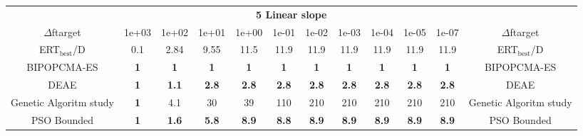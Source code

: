 \begin{tabular}{cccccccccccc}
 & \multicolumn{10}{c}{{\normalsize \textbf{5 Linear slope}}}\\
$\Delta$ftarget& 1e+03& 1e+02& 1e+01& 1e+00& 1e-01& 1e-02& 1e-03& 1e-04& 1e-05& 1e-07 & $\Delta$ftarget \\
ERT$_{\textrm{best}}$/D& 0.1& 2.84& 9.55& 11.5& 11.9& 11.9& 11.9& 11.9& 11.9& 11.9 & ERT$_{\textrm{best}}$/D \\
\hline
BIPOPCMA-ES & \textbf{1} & \textbf{1} & \textbf{1} & \textbf{1} & \textbf{1} & \textbf{1} & \textbf{1} & \textbf{1} & \textbf{1} & \textbf{1} & BIPOPCMA-ES \cite{add_an_entry_for_BIPOPCMA-ES_in_bbob.bib}\\
DEAE & \textbf{1} & \textbf{1.1} & \textbf{2.8} & \textbf{2.8} & \textbf{2.8} & \textbf{2.8} & \textbf{2.8} & \textbf{2.8} & \textbf{2.8} & \textbf{2.8} & DEAE \cite{add_an_entry_for_DEAE_in_bbob.bib}\\
Genetic Algoritm study & \textbf{1} & 4.1 & 30 & 39 & 110 & 210 & 210 & 210 & 210 & 210 & Genetic Algoritm study \cite{add_an_entry_for_Genetic Algoritm study_in_bbob.bib}\\
PSO Bounded & \textbf{1} & \textbf{1.6} & \textbf{5.8} & \textbf{8.9} & \textbf{8.8} & \textbf{8.9} & \textbf{8.9} & \textbf{8.9} & \textbf{8.9} & \textbf{8.9} & PSO Bounded \cite{add_an_entry_for_PSO Bounded_in_bbob.bib}
\end{tabular}
